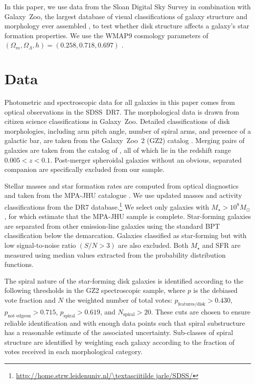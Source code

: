 \documentclass[useAMS,usenatbib]{mn2e}
\newcommand{\mytilde}{\textasciitilde}
\begin{document}
In this paper, we use data from the Sloan Digital Sky Survey \citep[SDSS;][]{yor00,str02,aba09} in combination with Galaxy~Zoo, the largest database of visual classifications of galaxy structure and morphology ever assembled \citep{lin08,lin11,wil13}, to test whether disk structure affects a galaxy's star formation properties. We use the WMAP9 cosmology parameters of $(\Omega_m,\Omega_\Lambda,h)=(0.258,0.718,0.697)$ \citep{hin13}.


\section{Data} \label{sec-data}

Photometric and spectroscopic data for all galaxies in this paper comes from optical observations in the SDSS~DR7. The morphological data is drawn from citizen science classifications in Galaxy~Zoo. Detailed classifications of disk morphologies, including arm pitch angle, number of spiral arms, and presence of a galactic bar, are taken from the Galaxy~Zoo~2 (GZ2) catalog \citep{wil13}. Merging pairs of galaxies are taken from the catalog of \citet{dar10a}, all of which lie in the redshift range $0.005<z<0.1$. Post-merger spheroidal galaxies without an obvious, separated companion are specifically excluded from our sample.

Stellar masses and star formation rates are computed from optical diagnostics and taken from the MPA-JHU catalogue \citep{kau03a,bri04,sal07}. We use updated masses and activity classifications from the DR7 database.\footnote{\url{http://home.strw.leidenuniv.nl/\mytilde jarle/SDSS/}} We select only galaxies with $M_\star > 10^8 M_\odot$, for which \citet{bri04} estimate that the MPA-JHU sample is complete. Star-forming galaxies are separated from other emission-line galaxies using the standard BPT classification \citep*{bal81} below the \citet{kau03} demarcation. Galaxies classified as star-forming but with low signal-to-noise ratio $(S/N > 3)$ are also excluded. Both $M_\star$ and SFR are measured using median values extracted from the probability distribution functions.

The spiral nature of the star-forming disk galaxies is identified according to the following thresholds in the GZ2 spectroscopic sample, where $p$ is the debiased vote fraction and $N$ the weighted number of total votes: $p_\textrm{features/disk} > 0.430$, $p_\textrm{not~edgeon} > 0.715$, $p_\textrm{spiral}>0.619$, and $N_\textrm{spiral}>20$. These cuts are chosen to ensure reliable identification and with enough data points such that spiral substructure has a reasonable estimate of the associated uncertainty. Sub-classes of spiral structure are identified by weighting each galaxy according to the fraction of votes received in each morphological category. 
\end{document}
